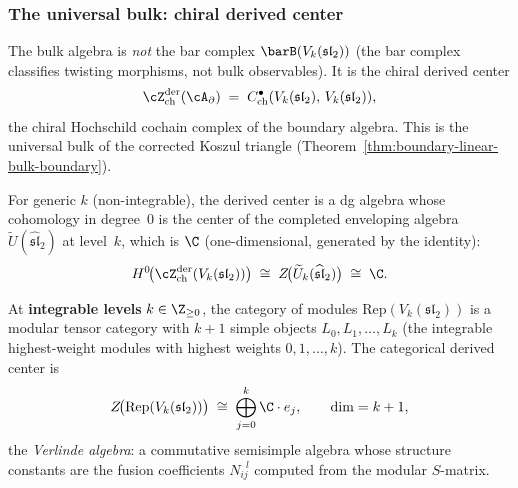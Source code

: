 \subsubsection{The universal bulk: chiral derived center}
\label{subsubsec:benchmark-derived-center}

The bulk algebra is \emph{not} the bar complex $\barB(V_k(\mathfrak{sl}_2))$
(the bar complex classifies twisting morphisms, not bulk observables). It is the chiral derived center
\begin{equation}\label{eq:benchmark-derived-center}
 \cZ^{\mathrm{der}}_{\mathrm{ch}}(\cA_\partial)
 \;=\;
 C^\bullet_{\mathrm{ch}}(V_k(\mathfrak{sl}_2),\,
 V_k(\mathfrak{sl}_2)),
\end{equation}
the chiral Hochschild cochain complex of the boundary algebra.
This is the universal bulk of the corrected Koszul triangle
(Theorem~\ref{thm:boundary-linear-bulk-boundary}).

For generic $k$ (non-integrable), the derived center is
a dg algebra whose cohomology in degree~$0$ is the center of the
completed enveloping algebra $\widetilde{U}(\widehat{\mathfrak{sl}}_2)$
at level~$k$, which is $\C$ (one-dimensional, generated by the
identity):
\begin{equation}\label{eq:benchmark-center-generic}
 H^0\!\bigl(\cZ^{\mathrm{der}}_{\mathrm{ch}}(V_k(\mathfrak{sl}_2))\bigr)
 \;\cong\;
 Z\!\bigl(\widetilde{U}_k(\widehat{\mathfrak{sl}}_2)\bigr)
 \;\cong\;
 \C.
\end{equation}

At \textbf{integrable levels} $k \in \Z_{\ge 0}$, the category
of modules $\mathrm{Rep}(V_k(\mathfrak{sl}_2))$ is a modular
tensor category with $k + 1$ simple objects
$L_0, L_1, \ldots, L_k$ (the integrable highest-weight modules
with highest weights $0, 1, \ldots, k$). The categorical
derived center is
\begin{equation}\label{eq:benchmark-center-integrable}
 Z\!\bigl(\mathrm{Rep}(V_k(\mathfrak{sl}_2))\bigr)
 \;\cong\;
 \bigoplus_{j=0}^k \C \cdot e_j,
 \qquad \dim = k + 1,
\end{equation}
the \emph{Verlinde algebra}: a commutative semisimple algebra
whose structure constants are the fusion coefficients
$N_{ij}^{\;\;l}$ computed from the modular $S$-matrix.


